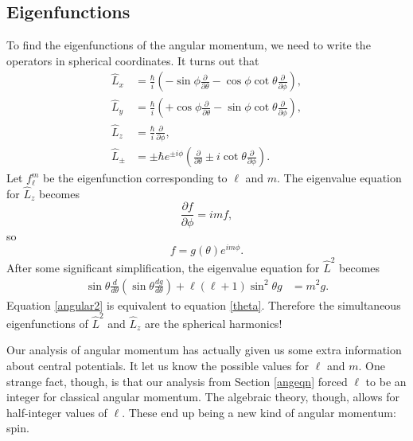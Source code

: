 \subsection*{Eigenfunctions}
To find the eigenfunctions of the angular momentum, we need to write the operators in spherical coordinates. It turns out that 
\begin{align}
    \hat{L}_x &= \frac{\hbar}{i} \left(-\sin \phi \frac{\partial}{\partial \theta} - \cos \phi \cot \theta \frac{\partial}{\partial \phi} \right), \\
    \hat{L}_y &= \frac{\hbar}{i} \left(+\cos \phi \frac{\partial}{\partial \theta} - \sin \phi \cot \theta \frac{\partial}{\partial \phi} \right), \\
    \hat{L}_z &= \frac{\hbar}{i} \frac{\partial}{\partial \phi},\\
    \hat{L}_{\pm} &= \pm \hbar e^{\pm i \phi} \left(\frac{\partial}{\partial \theta} \pm i \cot \theta \frac{\partial}{\partial \phi} \right).
\end{align}
Let $f_\ell^m$ be the eigenfunction corresponding to $\ell$ and $m$. The eigenvalue equation for $\hat{L}_z$ becomes 
\begin{equation*}
    \frac{\partial f}{\partial \phi} = i m f,
\end{equation*}
so 
\begin{equation*}
    f = g(\theta) e^{im\phi}.
\end{equation*}
After some significant simplification, the eigenvalue equation for $\hat{L}^2$ becomes
\begin{align}
         \sin \theta \frac{d}{d\theta}\left(\sin \theta \frac{dg}{d\theta} \right) + \ell(\ell+1) \sin^2 \theta g &= m^2g. \label{angular2}
\end{align}
Equation \ref{angular2} is equivalent to equation \ref{theta}. Therefore the simultaneous eigenfunctions of $\hat{L}^2$ and $\hat{L}_z$ are the spherical harmonics! 

Our analysis of angular momentum has actually given us some extra information about central potentials. It let us know the possible values for $\ell$ and $m$. One strange fact, though, is that our analysis from Section \ref{angeqn} forced $\ell$ to be an integer for classical angular momentum. The algebraic theory, though, allows for half-integer values of $\ell$. These end up being a new kind of angular momentum: spin.